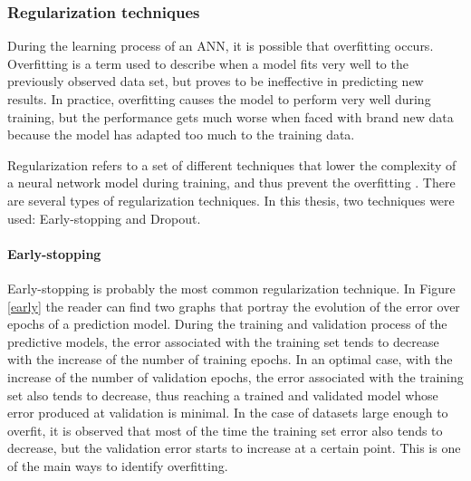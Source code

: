 \subsubsection{Regularization techniques}\label{chap3:subsubsec:regularization_techniques}

During the learning process of an \ac{ANN}, it is possible that overfitting occurs. Overfitting is a term used to describe when a model fits very well to the previously observed data set, but proves to be ineffective in predicting new results. In practice, overfitting causes the model to perform very well during training, but the performance gets much worse when faced with brand new data because the model has adapted too much to the training data.  

Regularization refers to a set of different techniques that lower the complexity of a neural network model during training, and thus prevent the overfitting \cite{reg0}. There are several types of regularization techniques. In this thesis, two techniques were used: Early-stopping and Dropout.

\paragraph*{Early-stopping}\label{sec:early}

Early-stopping is probably the most common regularization technique. In Figure \ref{early} the reader can find two graphs that portray the evolution of the error over epochs of a prediction model. During the training and validation process of the predictive models, the error associated with the training set tends to decrease with the increase of the number of training epochs. In an optimal case, with the increase of the number of validation epochs, the error associated with the training set also tends to decrease, thus reaching a trained and validated model whose error produced at validation is minimal. In the case of datasets large enough to overfit, it is observed that most of the time the training set error also tends to decrease, but the validation error starts to increase at a certain point. This is one of the main ways to identify overfitting.

